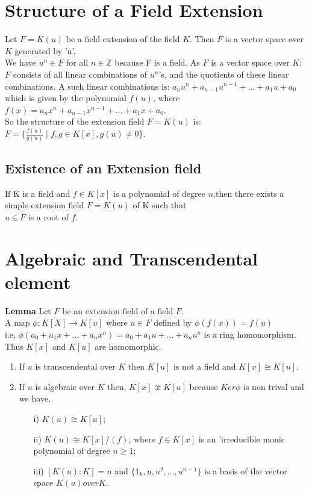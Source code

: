 \section{Structure of a Field Extension}
Let \(F=K(u)\) be a field extension of the field \(K\). Then \(F\) is a vector space over \(K\) generated by 'u'.\\
We have \(u^n \in F\) for all \(n \in \mathbb{Z}\) because F is a field. As \(F\) is a vector space over \(K\); \(F\) consists of all linear combinations of \(u^n \)'s, and the quotients of these linear combinations. A such linear combinations is: \(a_nu^n+a_{n-1}u^{n-1}+...+a_1u+a_0\) which is  given by the polynomial \(f(u)\), where \(f(x)=a_nx^n+a_{n-1}x^{n-1}+...+a_1x+a_0\).\\

So the structure of the extension field \(F=K(u)\) is:\\
\(F= \{\frac{f(u)}{g(u)} \;| \; f,g \in K[x],g(u) \neq 0\}\).


\subsection{Existence of an Extension field}

If K is a field and \(f \in K[x]\) is a polynomial of degree \(n\),then there exists a simple extension field \(F=K(u)\) of K such that\\
\(u\in F\) is a root of \(f\).

\section{Algebraic and Transcendental element}

\textbf{Lemma} \hspace{3mm} Let \(F\) be an extension field of a field \(F\).\\
A map \(\phi:K[X] \rightarrow K[u]\) where \(u \in F\) defined by \(\phi (f(x))=f(u)\)\\
i.e, \(\phi (a_0+a_1x+...+a_nx^n)= a_0+a_1u+...+a_nu^n\) is a ring homomorphism.\\

Thus \( K[x]\) and \(K[u]\) are homomorphic.
  \begin{enumerate}
  \item If \(u\) is transcendental over \(K\) then \(K[u]\) is not a field and \(K[x] \cong K[u]\).
  \item If \(u\) is algebraic over \(K\) then, \(K[x] \ncong K[u]\) because \(Ker\phi\) is non trival and we have,
    \begin{enumerate}
    \item[i)] \(K(u) \cong K[u]\);
    \item[ii)] \(K(u) \cong K[x]/(f)\), where \(f \in K[x]\) is an 'irreducible monic polynomial of degree \(n \geq 1\);
    \item[iii)] \([K(u):K]=n\) and \(\{1_k,u,u^2,...,u^{n-1}\}\) is a basis of the vector space \(K(u) over K\).
    \end{enumerate}
  \end{enumerate}

